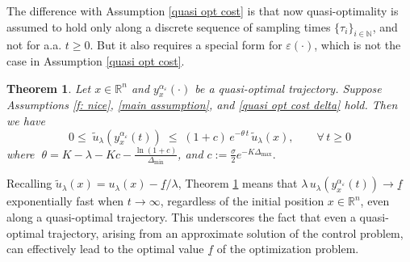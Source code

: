 \documentclass[12pt]{amsart}
\numberwithin{equation}{section}
\theoremstyle{plain}
\newtheorem{theorem}{Theorem}[section]
\begin{document}
The difference with Assumption \ref{quasi opt cost} is that now quasi-optimality is assumed to hold only along a discrete sequence of sampling times $\{\tau_{i}\}_{i\in \mathbb{N}}$, and not for a.a. $t\geq 0$. But it also requires a special form for $\varepsilon(\cdot)$, which is not the case in Assumption \ref{quasi opt cost}. 

\begin{theorem}\label{thm: conv value quasiopt delta}
Let $x\in \mathbb{R}^{n}$ and $y_{x}^{\alpha_{\varepsilon}}(\cdot)$ be a quasi-optimal trajectory. 
Suppose Assumptions \ref{f: nice}, \ref{main assumption}, and \ref{quasi opt cost delta} hold. Then we have
\begin{equation}\label{conv theta}
    0\leq\;\tilde{u}_{\lambda}(y_{x}^{\alpha_{\varepsilon}}(t)) \;\leq\; (1+c)\, e^{-\theta\, t}\,\tilde{u}_{\lambda}(x), \quad\quad \forall\, t\geq0
\end{equation}
where $\;\theta = K-\lambda - Kc-\frac{\ln(1+c)}{\Delta_{\min}}$, \; and \; $c:=\tfrac{\sigma}{2}e^{-K\Delta_{\max}}.$ 
\end{theorem}

Recalling  $\tilde{u}_{\lambda}(x) = u_{\lambda}(x) - \underline{f}/\lambda$, Theorem \ref{thm: conv value quasiopt delta} means that 
$\lambda\,u_{\lambda}(y_{x}^{\alpha_{\varepsilon}}(t))\to \underline{f}$ exponentially fast when $t\to \infty$, regardless of the initial position $x\in \mathbb{R}^{n}$, even along a quasi-optimal trajectory. This underscores the fact that even a quasi-optimal trajectory, arising from an approximate solution of the control problem, can effectively lead to the optimal value $\underline{f}$ of the optimization problem. 
\end{document}
